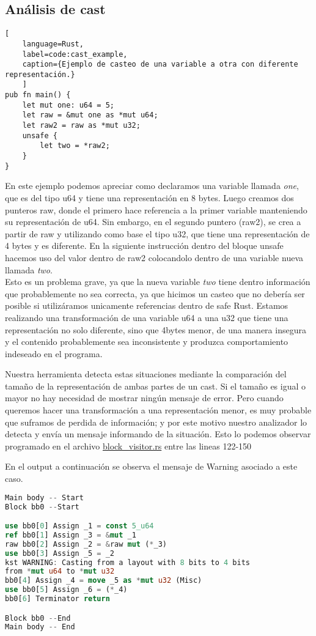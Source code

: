 \subsection{Análisis de cast}

\begin{lstlisting}[
    language=Rust,
    label=code:cast_example,
    caption={Ejemplo de casteo de una variable a otra con diferente representación.}
    ]
pub fn main() {
    let mut one: u64 = 5;
    let raw = &mut one as *mut u64;
    let raw2 = raw as *mut u32;
    unsafe {
        let two = *raw2;
    }
}
\end{lstlisting}

En este ejemplo podemos apreciar como declaramos una variable llamada \textit{one}, que es del tipo u64 y tiene una representación en 8 bytes.
Luego creamos dos punteros raw, donde el primero hace referencia a la primer variable manteniendo su representación de u64. Sin embargo,
en el segundo puntero (raw2), se crea a partir de raw y utilizando como base el tipo u32, que tiene una representación de 4 bytes y es diferente.
En la siguiente instrucción dentro del bloque unsafe hacemos uso del valor dentro de raw2 colocandolo dentro de una variable nueva llamada \textit{two}.\\
Esto es un problema grave, ya que la nueva variable \textit{two} tiene dentro información que probablemente no sea correcta, ya que hicimos un casteo
que no debería ser posible si utilizáramos unicamente referencias dentro de safe Rust. Estamos realizando una transformación de una variable u64
a una u32 que tiene una representación no solo diferente, sino que 4bytes menor, de una manera insegura y el contenido probablemente sea inconsistente
y produzca comportamiento indeseado en el programa.

Nuestra herramienta detecta estas situaciones mediante la comparación del tamaño de la representación de ambas partes de un cast. Si el tamaño es igual
o mayor no hay necesidad de mostrar ningún mensaje de error. Pero cuando queremos hacer una transformación a una representación menor, es muy probable
que suframos de perdida de información; y por este motivo nuestro analizador lo detecta y envía un mensaje informando de la situación. Esto lo podemos
observar programado en el archivo \href{run:../src/mir_visitor/block_visitor.rs}{block\_visitor.rs} entre las lineas 122-150

En el output a continuación se observa el mensaje de Warning asociado a este caso.

\begin{lstlisting}[language=rust]
Main body -- Start
Block bb0 --Start

use bb0[0] Assign _1 = const 5_u64
ref bb0[1] Assign _3 = &mut _1
raw bb0[2] Assign _2 = &raw mut (*_3)
use bb0[3] Assign _5 = _2
kst WARNING: Casting from a layout with 8 bits to 4 bits
from *mut u64 to *mut u32
bb0[4] Assign _4 = move _5 as *mut u32 (Misc)
use bb0[5] Assign _6 = (*_4)
bb0[6] Terminator return

Block bb0 --End
Main body -- End
\end{lstlisting}

